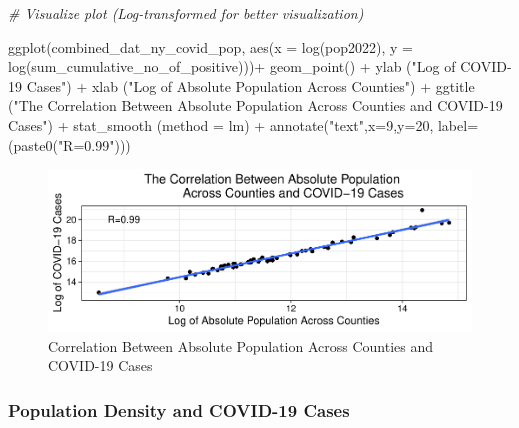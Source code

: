 \documentclass[
  12pt,
]{article}
\newenvironment{Shaded}{\begin{snugshade}}{\end{snugshade}}
\newcommand{\AttributeTok}[1]{\textcolor[rgb]{0.77,0.63,0.00}{#1}}
\newcommand{\CommentTok}[1]{\textcolor[rgb]{0.56,0.35,0.01}{\textit{#1}}}
\newcommand{\DecValTok}[1]{\textcolor[rgb]{0.00,0.00,0.81}{#1}}
\newcommand{\FunctionTok}[1]{\textcolor[rgb]{0.00,0.00,0.00}{#1}}
\newcommand{\NormalTok}[1]{#1}
\newcommand{\SpecialCharTok}[1]{\textcolor[rgb]{0.00,0.00,0.00}{#1}}
\newcommand{\StringTok}[1]{\textcolor[rgb]{0.31,0.60,0.02}{#1}}
\begin{document}
\begin{Shaded}
\begin{Highlighting}[]
\CommentTok{\# Visualize plot (Log{-}transformed for better visualization)}

\FunctionTok{ggplot}\NormalTok{(combined\_dat\_ny\_covid\_pop, }\FunctionTok{aes}\NormalTok{(}\AttributeTok{x =} \FunctionTok{log}\NormalTok{(pop2022), }\AttributeTok{y =} \FunctionTok{log}\NormalTok{(sum\_cumulative\_no\_of\_positive)))}\SpecialCharTok{+}
  \FunctionTok{geom\_point}\NormalTok{() }\SpecialCharTok{+}
  \FunctionTok{ylab}\NormalTok{ (}\StringTok{"Log of COVID{-}19 Cases"}\NormalTok{) }\SpecialCharTok{+}
  \FunctionTok{xlab}\NormalTok{ (}\StringTok{"Log of Absolute Population Across Counties"}\NormalTok{) }\SpecialCharTok{+}
  \FunctionTok{ggtitle}\NormalTok{ (}\StringTok{"The Correlation Between Absolute Population }
\StringTok{           Across Counties and COVID{-}19 Cases"}\NormalTok{) }\SpecialCharTok{+}
  \FunctionTok{stat\_smooth}\NormalTok{ (}\AttributeTok{method =} \StringTok{\textquotesingle{}lm\textquotesingle{}}\NormalTok{) }\SpecialCharTok{+}
  \FunctionTok{annotate}\NormalTok{(}\StringTok{"text"}\NormalTok{,}\AttributeTok{x=}\DecValTok{9}\NormalTok{,}\AttributeTok{y=}\DecValTok{20}\NormalTok{, }\AttributeTok{label=}\NormalTok{(}\FunctionTok{paste0}\NormalTok{(}\StringTok{"R=0.99"}\NormalTok{)))}
\end{Highlighting}
\end{Shaded}

\begin{figure}
\centering
\includegraphics{EDA_Final_Group_Project_files/figure-latex/unnamed-chunk-17-1.pdf}
\caption{Correlation Between Absolute Population Across Counties and
COVID-19 Cases}
\end{figure}

\hypertarget{population-density-and-covid-19-cases}{%
\subsubsection{Population Density and COVID-19
Cases}\label{population-density-and-covid-19-cases}}
\end{document}

